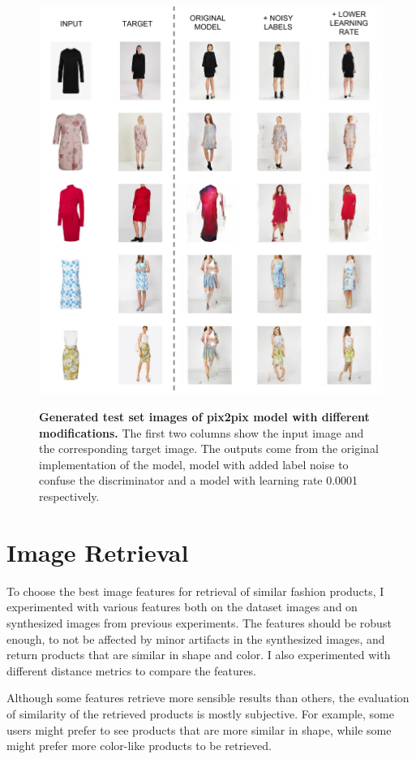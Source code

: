\documentclass[12pt]{report}
\begin{document}
\begin{figure}[!h]
\centering
{\includegraphics[width=.8\linewidth]{04_experiments/pix2pix/results}}
\caption{\label{fig:pix2pix_results} \textbf{Generated test set images of pix2pix model with different modifications.} The first two columns show the input image and the corresponding target image. The outputs come from the original implementation of the model, model with added label noise to confuse the discriminator and a model with learning rate 0.0001 respectively.}
\end{figure}

\pagebreak
\section{Image Retrieval}
To choose the best image features for retrieval of similar fashion products, I experimented with various features both on the dataset images and on synthesized images from previous experiments. The features should be robust enough, to not be affected by minor artifacts in the synthesized images, and return products that are similar in shape and color. I also experimented with different distance metrics to compare the features.

Although some features retrieve more sensible results than others, the evaluation of similarity of the retrieved products is mostly subjective. For example, some users might prefer to see products that are more similar in shape, while some might prefer more color-like products to be retrieved.
\end{document}
